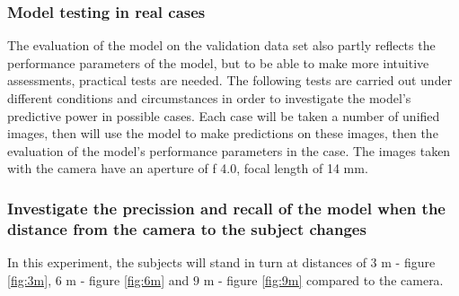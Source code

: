 \documentclass[conference]{IEEEtran}
\begin{document}
\subsubsection{Model testing in real cases}
The evaluation of the model on the validation data set also partly reflects the performance parameters of the model, but to be able to make more intuitive assessments, practical tests are needed. The following tests are carried out under different conditions and circumstances in order to investigate the model's predictive power in possible cases. Each case will be taken a number of unified images, then will use the model to make predictions on these images, then the evaluation of the model's performance parameters in the case. The images taken with the camera have an aperture of f 4.0, focal length of 14 mm.
\subsubsection{Investigate the precission and recall of the model when the distance from the camera to the subject changes}
In this experiment, the subjects will stand in turn at distances of $ 3 $ m - figure \ref{fig:3m}, $ 6 $ m - figure \ref{fig:6m} and $ 9 $ m - figure \ref{fig:9m} compared to the camera.
\end{document}
